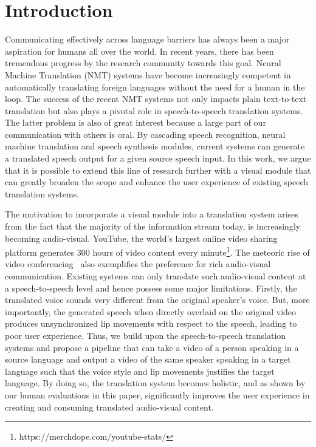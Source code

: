 \documentclass[sigconf]{acmart}
\begin{document}
\section{Introduction}
Communicating effectively across language barriers has always been a major aspiration for humans all over the world. In recent years, there has been tremendous progress by the research community towards this goal. Neural Machine Translation (NMT) systems have become increasingly competent\cite{wu2016google,bahdanau2014neural,vaswani2017attention} in automatically translating foreign languages without the need for a human in the loop. The success of the recent NMT systems not only impacts plain text-to-text translation but also plays a pivotal role in speech-to-speech translation systems. The latter problem is also of great interest because a large part of our communication with others is oral. By cascading speech recognition, neural machine translation and speech synthesis modules, current systems can generate a translated speech output for a given source speech input\cite{skype,federmann2016microsoft}. In this work, we argue that it is possible to extend this line of research further with a visual module that can greatly broaden the scope and enhance the user experience of existing speech translation systems.

The motivation to incorporate a visual module into a translation system arises from the fact that the majority of the information stream today, is increasingly becoming audio-visual. YouTube, the world's largest online video sharing platform generates 300 hours of video content every minute\footnote{https://merchdope.com/youtube-stats/}. The meteoric rise of video conferencing~\cite{videocalling} also exemplifies the preference for rich audio-visual communication. Existing systems can only translate such audio-visual content at a speech-to-speech level and hence possess some major limitations. Firstly, the translated voice sounds very different from the original speaker's voice. But, more importantly, the generated speech when directly overlaid on the original video produces unsynchronized lip movements with respect to the speech, leading to poor user experience. Thus, we build upon the speech-to-speech translation systems and propose a pipeline that can take a video of a person speaking in a source language and output a video of the same speaker speaking in a target language such that the voice style and lip movements justifies the target language. By doing so, the translation system becomes holistic, and as shown by our human evaluations in this paper, significantly improves the user experience in creating and consuming translated audio-visual content.  
\end{document}
